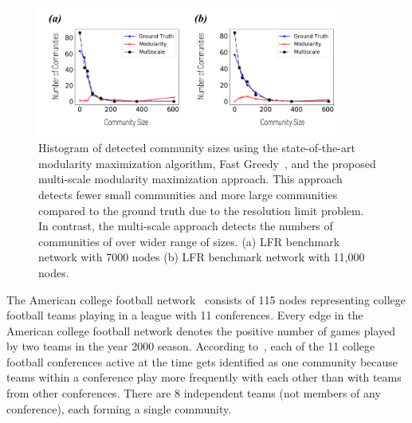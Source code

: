 \begin{figure}[!ht]
    \centering
    \includegraphics[width=0.9\textwidth]{img/chap2/Fig5.pdf}
    \caption{Histogram of detected community sizes using the state-of-the-art modularity maximization algorithm, Fast Greedy~\cite{clauset2004finding}, and the proposed multi-scale modularity maximization approach. This approach detects fewer small communities and more large communities compared to the ground truth due to the resolution limit problem. In contrast, the multi-scale approach detects the numbers of communities of over wider range of sizes. (a) LFR benchmark network with 7000 nodes (b) LFR benchmark network with 11,000 nodes.}
    \label{fig:5}
\end{figure}

The American college football network~\cite{evans2010clique} consists of 115 nodes representing college football teams playing in a league with 11 conferences. Every edge in the American college football network denotes the positive number of games played by two teams in the year 2000 season. According to~\cite{evans2010clique}, each of the 11 college football conferences active at the time gets identified as one community because teams within a conference play more frequently with each other than with teams from other conferences. There are 8 independent teams (not members of any conference), each forming a single community. 

